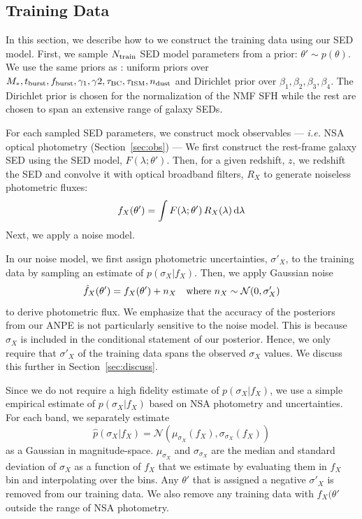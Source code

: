 \subsection{Training Data} \label{sec:training}
In this section, we describe how to we construct the training data using our
SED model.
First, we sample $N_{\rm train}$ SED model parameters from a prior: $\theta'\sim p(\theta)$. 
We use the same priors as : uniform priors over $M_*,
t_{\rm burst}, f_{\rm burst}, \gamma_1, \gamma2, \tau_{\rm BC}, \tau_{\rm ISM},
n_{\rm dust}$ and Dirichlet prior over $\beta_1, \beta_2, \beta_3, \beta_4$. 
The Dirichlet prior is chosen for the normalization of the NMF SFH while the
rest are chosen to span an extensive range of galaxy SEDs. 

For each sampled SED parameters, we construct mock observables --- \emph{i.e.}
NSA optical photometry (Section~\ref{sec:obs}) --- 
We first construct the rest-frame galaxy SED using the SED model,
$F(\lambda;\theta')$. 
Then, for a given redshift, $z$, we redshift the SED and convolve it with
optical broadband filters, $R_X$ to generate noiseless photometric fluxes:
\begin{equation}
    f_X(\theta') = \int F(\lambda;\theta') \, R_X(\lambda) \, {\rm d}\lambda
\end{equation}
Next, we apply a noise model.

In our noise model, we first assign photometric uncertainties, $\sigma'_X$, to
the training data by sampling an estimate of $p(\sigma_X | f_X)$. 
Then, we apply Gaussian noise
\begin{equation}
    \hat{f}_X(\theta') = f_X(\theta') + n_X  \quad {\rm where}~n_X \sim \mathcal{N}(0, \sigma'_X)
\end{equation}
to derive photometric flux.
We emphasize that the accuracy of the posteriors from our ANPE is not
particularly sensitive to the noise model. 
This is because $\sigma_X$ is included in the conditional statement of our
posterior. 
Hence,  we only require that $\sigma'_X$ of the training data spans the observed
$\sigma_X$ values. 
We discuss this further in Section~\ref{sec:discuss}.

Since we do not require a high fidelity estimate of $p(\sigma_X | f_X)$, we use
a simple empirical estimate of $p(\sigma_X | f_X)$ based on NSA photometry and
uncertainties. 
For each band, we separately estimate  
\begin{equation}
    \hat{p}(\sigma_X | f_X) = \mathcal{N}( \mu_{\sigma_X}(f_X), \sigma_{\sigma_X}(f_X))
\end{equation}
as a Gaussian in magnitude-space. 
$\mu_{\sigma_X}$ and $\sigma_{\sigma_X}$ are the median and standard deviation
of $\sigma_X$ as a function of $f_X$ that we estimate by evaluating them in
$f_X$ bin and interpolating over the bins. 
Any $\theta'$ that is assigned a negative $\sigma'_X$ is removed from our
training data. 
We also remove any training data with $f_X(\theta'$ outside the range of NSA
photometry. 

